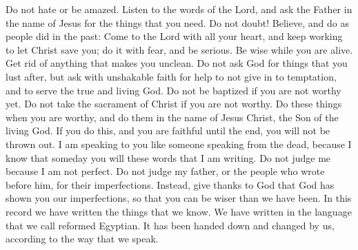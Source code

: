 Do not hate or be amazed. Listen to the words of the Lord, and ask the Father in the name of Jesus for the things that you need. Do not doubt! Believe, and do as people did in the past: Come to the Lord with all your heart, and keep working to let Christ save you; do it with fear, and be serious.
\bverse \iffalse Be wise in the days of your probation; strip yourselves of all uncleanness; ask not, that ye may consume it on your lusts, but ask with a firmness unshaken, that ye will yield to no temptation, but that ye will serve the true and living God. \fi
Be wise while you are alive. Get rid of anything that makes you unclean. Do not ask God for things that you lust after, but ask with unshakable faith for help to not give in to temptation, and to serve the true and living God.
\bverse \iffalse See that ye are not baptized unworthily; see that ye partake not of the sacrament of Christ unworthily; but see that ye do all things in worthiness, and do it in the name of Jesus Christ, the Son of the living God; and if ye do this, and endure to the end, ye will in nowise be cast out. \fi
Do not be baptized if you are not worthy yet. Do not take the sacrament of Christ if you are not worthy. Do these things when you are worthy, and do them in the name of Jesus Christ, the Son of the living God. If you do this, and you are faithful until the end, you will not be thrown out.
\bverse \iffalse Behold, I speak unto you as though I spake from the dead; for I know that ye shall have my words. \fi
I am speaking to you like someone speaking from the dead, because I know that someday you will these words that I am writing.
\bverse \iffalse Condemn me not because of mine imperfection, neither my father, because of his imperfection, neither them who have written before him; but rather give thanks unto God that he hath made manifest unto you our imperfections, that ye may learn to be more wise than we have been. \fi
Do not judge me because I am not perfect. Do not judge my father, or the people who wrote before him, for their imperfections. Instead, give thanks to God that God has shown you our imperfections, so that you can be wiser than we have been.
\bverse \iffalse And now, behold, we have written this record according to our knowledge, in the characters which are called among us the reformed Egyptian, being handed down and altered by us, according to our manner of speech. \fi
In this record we have written the things that we know. We have written in the language that we call reformed Egyptian. It has been handed down and changed by us, according to the way that we speak.
